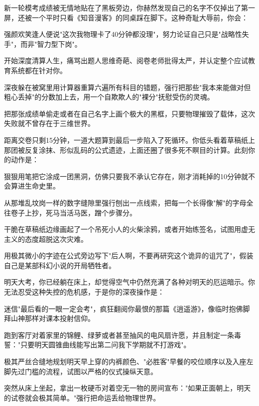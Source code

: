 \documentclass{exam-zh}
\begin{document}
\begin{question}[points = 5]
  新一轮模考成绩被无情地贴在了黑板旁边，你赫然发现自己的名字不仅掉出了第一屏，还被一个平时只看《知音漫客》的同桌踩在脚下。这种奇耻大辱前，你会：
  \begin{choices}
    \item 强颜欢笑逢人便说"这次我物理卡了40分钟都没理"，努力论证自己只是"战略性失手"，而非"智力型下岗"。
    \item 开始深度清算人生，痛骂出题人思维奇葩、阅卷老师批得太严，并认定整个应试教育系统都在针对你。
    \item 深夜躲在被窝里用计算器重算六遍所有科目的错题，强行把那些"我本来能做对但粗心丢掉"的分数加上去，用一个自欺欺人的"裸分"抚慰受伤的灵魂。
    \item 把那张成绩单偷走或者在自己名字上画个极大的黑框，只要物理摧毁了载体，这次失败就不曾存在于三维世界。
  \end{choices}
\end{question}

\begin{question}[points = 5]
  距离交卷只剩15分钟，一道大题算到最后一步陷入了死循环。你低头看着草稿纸上那团被反复涂抹、形似乱码的公式遗迹，上面还圈了很多死不瞑目的计算。此刻你的动作是：
  \begin{choices}
    \item 狠狠用笔把它涂成一团黑洞，仿佛只要我不承认它存在，刚才消耗掉的10分钟就不会算进生命史里。
    \item 从那堆乱坟岗一样的数字缝隙里强行刨出一点线索，把每一个长得像"解"的字母全往卷子上抄，死马当活马医，蹭个步骤分。
    \item 干脆在草稿纸边缘画起了一个吊死小人的火柴涂鸦，或者开始练签名，试图用虚无主义的态度超脱这次灾难。
    \item 用极其微小的字迹在公式旁边写下"后人啊，不要再研究这个诡异的诅咒了"，假装自己是某部科幻小说的开局牺牲者。
  \end{choices}
\end{question}

\begin{question}[points = 5]
  明天大考，你已经躺在床上，却觉得空气中仍然充满了各种对明天的厄运暗示。你无法忍受这种失控的危机感，于是你的深夜操作是：
  \begin{choices}
    \item 迷信"最后看的一眼一定会考"，疯狂翻阅你最恨的那篇《逍遥游》，像临时抱佛脚拜山神那样对课本投射信仰。
    \item 跑到客厅对着家里的锦鲤、绿萝或者甚至抽风的电风扇许愿，并且制定一条毒誓："只要明天圆锥曲线能写出第二问我下学期就不打游戏"。
    \item 极其严丝合缝地规划明天早上穿的内裤颜色、"必胜客"早餐的咬位顺序以及入座左脚先过门槛的流程，试图以严格的仪式操纵天意。
    \item 突然从床上坐起，拿出一枚硬币对着空无一物的房间宣布："如果正面朝上，明天的试卷就会极其简单。"强行把命运丢给物理世界。
  \end{choices}
\end{question}
\end{document}
